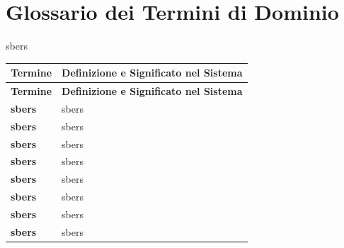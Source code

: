 \section{Glossario dei Termini di Dominio}

sbers

\begin{center}
\renewcommand{\arraystretch}{1.3}
\begin{longtable}{|p{4.5cm}|p{11cm}|}
\hline
\rowcolor{tableheader} \textbf{Termine} & \textbf{Definizione e Significato nel Sistema} \\ \hline
\endfirsthead

\hline
\rowcolor{tableheader} \textbf{Termine} & \textbf{Definizione e Significato nel Sistema} \\ \hline
\endhead

\textbf{sbers} & sbers \\ \hline
\textbf{sbers} & sbers \\ \hline
\textbf{sbers} & sbers \\ \hline
\textbf{sbers} & sbers \\ \hline
\textbf{sbers} & sbers \\ \hline
\textbf{sbers} & sbers \\ \hline
\textbf{sbers} & sbers \\ \hline
\textbf{sbers} & sbers \\ \hline
\end{longtable}
\end{center}
